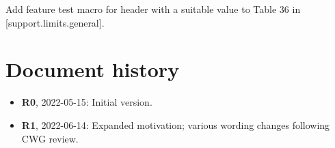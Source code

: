 Add feature test macro
 for header  with a suitable value to
Table 36 in [support.limits.general].


\section*{Document history}

\begin{itemize}
\item \textbf{R0}, 2022-05-15: Initial version.
\item \textbf{R1}, 2022-06-14: Expanded motivation; various wording changes following CWG review.
\end{itemize}





\renewcommand{\bibname}{References}



